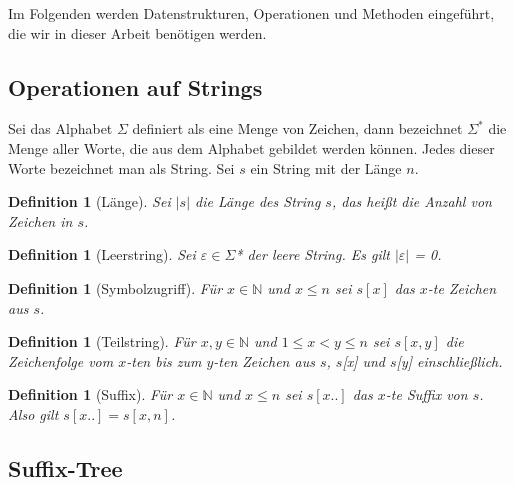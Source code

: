 \documentclass[a4paper,11pt]{scrartcl}%
\theoremstyle{change}
\theoremstyle{nonumberplain}
\theoremstyle{change}
\newtheorem{definition}[theorem]{Definition}
\theoremstyle{nonumberplain}
\theoremstyle{change}
\theoremstyle{nonumberplain}
\begin{document}
Im Folgenden werden Datenstrukturen, Operationen und Methoden eingeführt, die wir in dieser Arbeit benötigen werden.

\subsection{Operationen auf Strings}

Sei das Alphabet $\Sigma$ definiert als eine Menge von Zeichen, dann bezeichnet $\Sigma^{*}$ die Menge aller Worte, die aus dem Alphabet gebildet werden können. Jedes dieser Worte bezeichnet man als String.
	Sei $s$ ein String mit der Länge $n$.
	
	\begin{definition}[Länge]
		Sei $|s|$ die Länge des String $s$, das heißt die Anzahl von Zeichen in $s$.
	\end{definition}
	
	\begin{definition}[Leerstring]
		Sei $\varepsilon \in \Sigma$* der leere String. Es gilt $|\varepsilon|$ = 0.
	\end{definition}
	
	\begin{definition}[Symbolzugriff]
		Für $x \in \mathbb{N}$ und $x \leq n$ sei $s[x]$ das $x$-te Zeichen aus $s$.
	\end{definition}
	
	\begin{definition}[Teilstring]
		Für $x,y \in \mathbb{N}$ und $1 \leq x < y \leq n$ sei $s[x,y]$ die Zeichenfolge vom $x$-ten bis zum $y$-ten Zeichen aus $s$, $s$[x] und $s$[y] einschließlich.
	\end{definition}
	
	\begin{definition}[Suffix]
		 Für $x \in \mathbb{N}$ und $x \leq n$ sei $s[x..]$ das $x$-te Suffix von $s$. Also gilt $s[x..] = s[x,n]$.
	\end{definition}
	
\subsection{Suffix-Tree}
\end{document}
